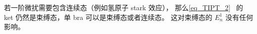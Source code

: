 
若一阶微扰需要包含连续态（例如氢原子 stark 效应）， 那么\autoref{eq_TIPT_2}~ 的 ket 仍然是束缚态，单 bra 可以是束缚态或者连续态。 这对束缚态的 $E_n^1$ 没有任何影响。
